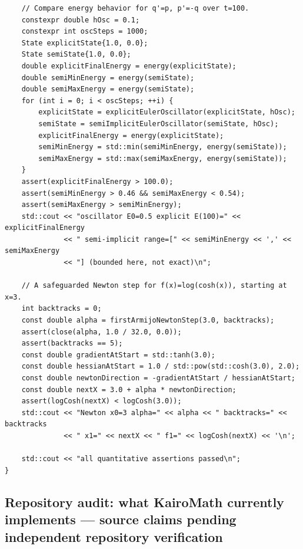 \begin{verbatim}
    // Compare energy behavior for q'=p, p'=-q over t=100.
    constexpr double hOsc = 0.1;
    constexpr int oscSteps = 1000;
    State explicitState{1.0, 0.0};
    State semiState{1.0, 0.0};
    double explicitFinalEnergy = energy(explicitState);
    double semiMinEnergy = energy(semiState);
    double semiMaxEnergy = energy(semiState);
    for (int i = 0; i < oscSteps; ++i) {
        explicitState = explicitEulerOscillator(explicitState, hOsc);
        semiState = semiImplicitEulerOscillator(semiState, hOsc);
        explicitFinalEnergy = energy(explicitState);
        semiMinEnergy = std::min(semiMinEnergy, energy(semiState));
        semiMaxEnergy = std::max(semiMaxEnergy, energy(semiState));
    }
    assert(explicitFinalEnergy > 100.0);
    assert(semiMinEnergy > 0.46 && semiMaxEnergy < 0.54);
    assert(semiMaxEnergy > semiMinEnergy);
    std::cout << "oscillator E0=0.5 explicit E(100)=" << explicitFinalEnergy
              << " semi-implicit range=[" << semiMinEnergy << ',' << semiMaxEnergy
              << "] (bounded here, not exact)\n";

    // A safeguarded Newton step for f(x)=log(cosh(x)), starting at x=3.
    int backtracks = 0;
    const double alpha = firstArmijoNewtonStep(3.0, backtracks);
    assert(close(alpha, 1.0 / 32.0, 0.0));
    assert(backtracks == 5);
    const double gradientAtStart = std::tanh(3.0);
    const double hessianAtStart = 1.0 / std::pow(std::cosh(3.0), 2.0);
    const double newtonDirection = -gradientAtStart / hessianAtStart;
    const double nextX = 3.0 + alpha * newtonDirection;
    assert(logCosh(nextX) < logCosh(3.0));
    std::cout << "Newton x0=3 alpha=" << alpha << " backtracks=" << backtracks
              << " x1=" << nextX << " f1=" << logCosh(nextX) << '\n';

    std::cout << "all quantitative assertions passed\n";
}
\end{verbatim}

\subsection{Repository audit: what KairoMath currently implements --- source claims pending independent repository verification}\label{02-foundations-ii-ch028-repository-audit-what-kairomath-currently-implements-source-claims-pending-independent-repository-verification}

\hypertarget{02-foundations-ii-ch028-repository-audit-what-kairomath-currently-implements-source-claims-pending-independent-repository-verification}{}

